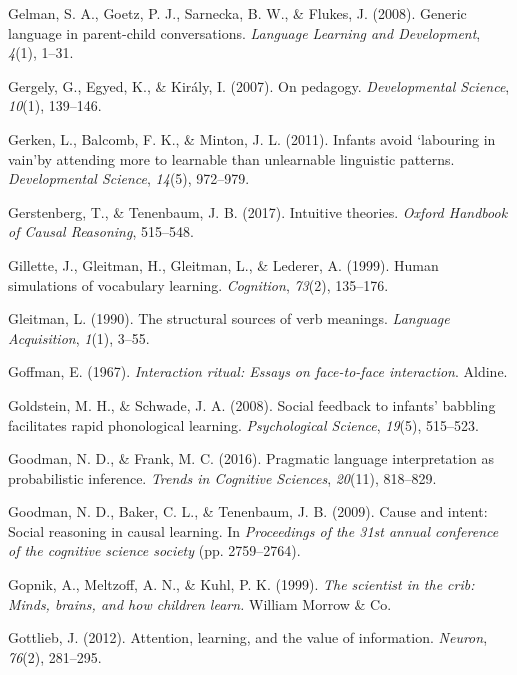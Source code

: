 \documentclass[oneside]{report}
\begin{document}
\hypertarget{ref-gelman2008generic}{}
Gelman, S. A., Goetz, P. J., Sarnecka, B. W., \& Flukes, J. (2008).
Generic language in parent-child conversations. \emph{Language Learning
and Development}, \emph{4}(1), 1--31.

\hypertarget{ref-gergely2007pedagogy}{}
Gergely, G., Egyed, K., \& Király, I. (2007). On pedagogy.
\emph{Developmental Science}, \emph{10}(1), 139--146.

\hypertarget{ref-gerken2011infants}{}
Gerken, L., Balcomb, F. K., \& Minton, J. L. (2011). Infants avoid
`labouring in vain'by attending more to learnable than unlearnable
linguistic patterns. \emph{Developmental Science}, \emph{14}(5),
972--979.

\hypertarget{ref-gerstenberg2017intuitive}{}
Gerstenberg, T., \& Tenenbaum, J. B. (2017). Intuitive theories.
\emph{Oxford Handbook of Causal Reasoning}, 515--548.

\hypertarget{ref-gillette1999human}{}
Gillette, J., Gleitman, H., Gleitman, L., \& Lederer, A. (1999). Human
simulations of vocabulary learning. \emph{Cognition}, \emph{73}(2),
135--176.

\hypertarget{ref-gleitman1990structural}{}
Gleitman, L. (1990). The structural sources of verb meanings.
\emph{Language Acquisition}, \emph{1}(1), 3--55.

\hypertarget{ref-goffman1967}{}
Goffman, E. (1967). \emph{Interaction ritual: Essays on face-to-face
interaction}. Aldine.

\hypertarget{ref-goldstein2008social}{}
Goldstein, M. H., \& Schwade, J. A. (2008). Social feedback to infants'
babbling facilitates rapid phonological learning. \emph{Psychological
Science}, \emph{19}(5), 515--523.

\hypertarget{ref-goodman2016pragmatic}{}
Goodman, N. D., \& Frank, M. C. (2016). Pragmatic language
interpretation as probabilistic inference. \emph{Trends in Cognitive
Sciences}, \emph{20}(11), 818--829.

\hypertarget{ref-goodman2009cause}{}
Goodman, N. D., Baker, C. L., \& Tenenbaum, J. B. (2009). Cause and
intent: Social reasoning in causal learning. In \emph{Proceedings of the
31st annual conference of the cognitive science society} (pp.
2759--2764).

\hypertarget{ref-gopnik1999scientist}{}
Gopnik, A., Meltzoff, A. N., \& Kuhl, P. K. (1999). \emph{The scientist
in the crib: Minds, brains, and how children learn.} William Morrow \&
Co.

\hypertarget{ref-gottlieb2012attention}{}
Gottlieb, J. (2012). Attention, learning, and the value of information.
\emph{Neuron}, \emph{76}(2), 281--295.
\end{document}
